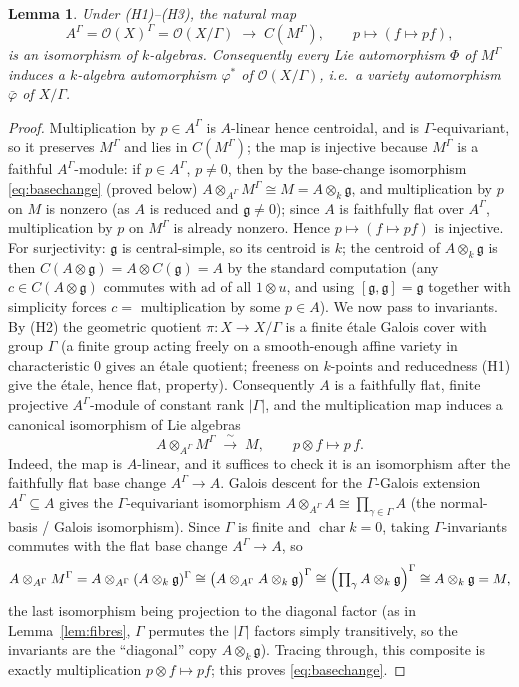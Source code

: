 \documentclass{amsart}
\newtheorem{lemma}{Lemma}
\theoremstyle{definition}
\newcommand{\g}{\mathfrak{g}}
\newcommand{\OO}{\mathcal{O}}
\newcommand{\M}{M}
\begin{document}
\begin{lemma}\label{lem:centroid}
Under \textnormal{(H1)--(H3)}, the natural map
\[
A^\Gamma=\OO(X)^\Gamma=\OO(X/\Gamma)\;\longrightarrow\;C(\M^\Gamma),
\qquad p\mapsto(f\mapsto pf),
\]
is an isomorphism of $k$-algebras.  Consequently every Lie automorphism
$\Phi$ of $\M^\Gamma$ induces a $k$-algebra automorphism $\varphi^*$ of
$\OO(X/\Gamma)$, i.e.\ a variety automorphism $\bar\varphi$ of $X/\Gamma$.
\end{lemma}
\begin{proof}
Multiplication by $p\in A^\Gamma$ is $A$-linear hence centroidal, and is
$\Gamma$-equivariant, so it preserves $\M^\Gamma$ and lies in
$C(\M^\Gamma)$; the map is injective because $\M^\Gamma$ is a faithful
$A^\Gamma$-module: if $p\in A^\Gamma$, $p\ne0$, then by the base-change
isomorphism \eqref{eq:basechange} (proved below) $A\otimes_{A^\Gamma}
\M^\Gamma\cong\M=A\otimes_k\g$, and multiplication by $p$ on $\M$ is
nonzero (as $A$ is reduced and $\g\ne0$); since $A$ is faithfully flat over
$A^\Gamma$, multiplication by $p$ on $\M^\Gamma$ is already nonzero.
Hence $p\mapsto(f\mapsto pf)$ is injective.  For surjectivity: $\g$ is central-simple, so its
centroid is $k$; the centroid of $A\otimes_k\g$ is then
$C(A\otimes\g)=A\otimes C(\g)=A$ by the standard computation
(any $c\in C(A\otimes\g)$ commutes with $\mathrm{ad}$ of all $1\otimes u$,
and using $[\g,\g]=\g$ together with simplicity forces $c=$ multiplication
by some $p\in A$).  We now pass to invariants.  By (H2) the geometric quotient
$\pi\colon X\to X/\Gamma$ is a finite \'etale Galois cover with group
$\Gamma$ (a finite group acting freely on a smooth-enough affine variety in
characteristic $0$ gives an \'etale quotient; freeness on $k$-points and
reducedness (H1) give the \'etale, hence flat, property).  Consequently
$A$ is a faithfully flat, finite projective $A^\Gamma$-module of constant
rank $|\Gamma|$, and the multiplication map induces a canonical
isomorphism of Lie algebras
\begin{equation}\label{eq:basechange}
A\otimes_{A^\Gamma}\M^\Gamma\;\xrightarrow{\ \sim\ }\;\M ,
\qquad p\otimes f\mapsto p\,f .
\end{equation}
Indeed, the map is $A$-linear, and it suffices to check it is an
isomorphism after the faithfully flat base change $A^\Gamma\to A$.  Galois
descent for the $\Gamma$-Galois extension $A^\Gamma\subseteq A$ gives the
$\Gamma$-equivariant isomorphism $A\otimes_{A^\Gamma}A\cong
\prod_{\gamma\in\Gamma}A$ (the normal-basis / Galois isomorphism).  Since
$\Gamma$ is finite and $\operatorname{char}k=0$, taking $\Gamma$-invariants
commutes with the flat base change $A^\Gamma\to A$, so
\[
A\otimes_{A^\Gamma}\M^\Gamma
=A\otimes_{A^\Gamma}(A\otimes_k\g)^\Gamma
\cong\bigl(A\otimes_{A^\Gamma}A\otimes_k\g\bigr)^\Gamma
\cong\Bigl(\textstyle\prod_{\gamma}A\otimes_k\g\Bigr)^\Gamma
\cong A\otimes_k\g=\M,
\]
the last isomorphism being projection to the diagonal factor (as in
Lemma~\ref{lem:fibres}, $\Gamma$ permutes the $|\Gamma|$ factors simply
transitively, so the invariants are the ``diagonal'' copy $A\otimes_k\g$).
Tracing through, this composite is exactly multiplication
$p\otimes f\mapsto pf$; this proves \eqref{eq:basechange}.


\end{proof}
\end{document}
